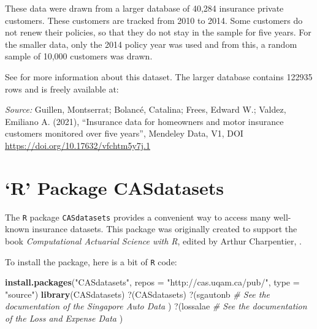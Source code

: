 \documentclass[
  12pt,
  krantz2]{Format/krantzNoCorner}
\newenvironment{Shaded}{\begin{snugshade}}{\end{snugshade}}
\newcommand{\AttributeTok}[1]{\textcolor[rgb]{0.27,0.27,0.27}{#1}}
\newcommand{\CommentTok}[1]{\textcolor[rgb]{0.37,0.37,0.37}{\textit{#1}}}
\newcommand{\FunctionTok}[1]{\textcolor[rgb]{0.27,0.27,0.27}{\textbf{#1}}}
\newcommand{\NormalTok}[1]{#1}
\newcommand{\StringTok}[1]{\textcolor[rgb]{0.5,0.5,0.5}{#1}}
\begin{document}
These data were drawn from a larger database of 40,284 insurance private customers. These customers are tracked from 2010 to 2014. Some customers do not renew their policies, so that they do not stay in the sample for five years. For the smaller data, only the 2014 policy year was used and from this, a random sample of 10,000 customers was drawn.

\newpage

See \citet{frees2021dependence} for more information about this dataset. The larger database contains 122935 rows and is freely available at:

\emph{Source:} Guillen, Montserrat; Bolancé, Catalina; Frees, Edward W.; Valdez, Emiliano A. (2021), ``Insurance data for homeowners and motor insurance customers monitored over five years'', Mendeley Data, V1, DOI \url{https://doi.org/10.17632/vfchtm5y7j.1}

\hypertarget{S:CASDatasets}{%
\section{`R' Package CASdatasets}\label{S:CASDatasets}}

The \texttt{R} package \texttt{CASdatasets} provides a convenient way to access many well-known insurance datasets. This package was originally created to support the book \emph{Computational Actuarial Science with R}, edited by Arthur Charpentier, \citet{charpentier2014computational}.

To install the package, here is a bit of \texttt{R} code:

\begin{Shaded}
\begin{Highlighting}[]
\FunctionTok{install.packages}\NormalTok{(}\StringTok{"CASdatasets"}\NormalTok{, }\AttributeTok{repos =} \StringTok{"http://cas.uqam.ca/pub/"}\NormalTok{, }\AttributeTok{type =} \StringTok{"source"}\NormalTok{)}
\FunctionTok{library}\NormalTok{(CASdatasets)}
\StringTok{\textasciigrave{}}\AttributeTok{?}\StringTok{\textasciigrave{}}\NormalTok{(CASdatasets)}
\StringTok{\textasciigrave{}}\AttributeTok{?}\StringTok{\textasciigrave{}}\NormalTok{(sgautonb  }\CommentTok{\# See the documentation of the Singapore Auto Data}
\NormalTok{)}
\StringTok{\textasciigrave{}}\AttributeTok{?}\StringTok{\textasciigrave{}}\NormalTok{(lossalae  }\CommentTok{\# See the documentation of the Loss and Expense Data}
\NormalTok{)}
\end{Highlighting}
\end{Shaded}
\end{document}
